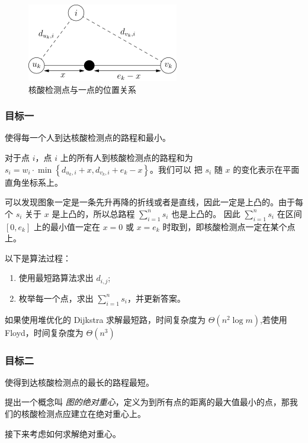\documentclass{cumcmthesis}
\begin{document}
\begin{figure}[H]
    \centering
    \includegraphics{images/Single-1}
    \caption{核酸检测点与一点的位置关系}
    \label{fig:Single-1}
\end{figure}

\subsubsection{目标一}

使得每一个人到达核酸检测点的路程和最小。

对于点 $i$，点 $i$ 上的所有人到核酸检测点的路程和为 $s_i=w_i\cdot\min\left\{d_{u_k,i}+x,d_{v_k,i}+e_k-x\right\}$。我们可以
把 $s_i$ 随 $x$ 的变化表示在平面直角坐标系上。


可以发现图象一定是一条先升再降的折线或者是直线，因此一定是上凸的。由于每个 $s_i$ 关于 $x$ 是上凸的，所以总路程 $\sum_{i=1}^n s_i$ 也是上凸的。
因此 $\sum_{i=1}^n s_i$ 在区间 $[0,e_k]$ 上的最小值一定在 $x=0$ 或 $x=e_k$ 时取到，即核酸检测点一定在某个点上。

以下是算法过程：

\begin{enumerate}
    \item 使用最短路算法求出 $d_{i,j}$;
    \item 枚举每一个点，求出 $\sum_{i=1}^n s_i$，并更新答案。
\end{enumerate}

如果使用堆优化的 Dijkstra 求解最短路，时间复杂度为 $\Theta(n^2\log m)$,若使用 Floyd，时间复杂度为 $\Theta(n^3)$

\subsubsection{目标二}

使得到达核酸检测点的最长的路程最短。

提出一个概念叫 \emph{图的绝对重心}，定义为到所有点的距离的最大值最小的点，那我们的核酸检测点应建立在绝对重心上。

接下来考虑如何求解绝对重心。
\end{document}
